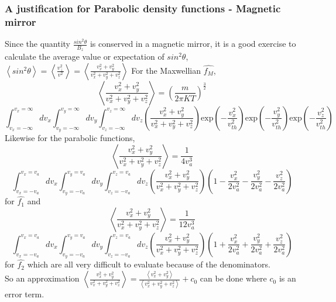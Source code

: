 \documentclass[12pt]{article}
\begin{document}
	\subsubsection{A justification for Parabolic density functions - Magnetic mirror}
	\noindent Since the quantity $\frac{\displaystyle sin^{2}\theta}{\displaystyle B_{z}}$ is conserved in a magnetic mirror, it is a good exercise to calculate the average value or expectation of $sin^{2}\theta$, $\left\langle sin^{2}\theta\right\rangle = \left\langle \frac{\displaystyle v_{\perp}^{2}}{\displaystyle v^{2}}\right\rangle = \left\langle \frac{\displaystyle v_{x}^{2} + v_{y}^{2}}{\displaystyle v_{x}^{2} + v_{y}^{2} +  v_{z}^{2}}\right\rangle $ 
	For the Maxwellian $\widehat{f_{M}}$,
	$$\left\langle \frac{\displaystyle v_{x}^{2} + v_{y}^{2}}{\displaystyle v_{x}^{2} + v_{y}^{2} +  v_{z}^{2}}\right\rangle = \left(\frac{m}{2\pi KT}\right)^{\frac{3}{2}} $$ 
	$$ \int_{v_{x} = - \infty}^{v_{x} = \infty} d v_{x} \int_{v_{y} = - \infty}^{v_{y} = \infty} d v_{y} \int_{v_{z} = - \infty}^{v_{z} = \infty} d v_{z} \left( \frac{\displaystyle v_{x}^{2} + v_{y}^{2}}{\displaystyle v_{x}^{2} + v_{y}^{2} + v_{z}^{2}} \right)  \mathrm{exp}\left(-\frac{v_{x}^{2}}{v_{th}^{2}}\right) \mathrm{exp}\left(-\frac{v_{y}^{2}}{v_{th}^{2}}\right) \mathrm{exp}\left(-\frac{v_{z}^{2}}{v_{th}^{2}}\right)$$
	Likewise for the parabolic functions,
	$$\left\langle \frac{\displaystyle v_{x}^{2} + v_{y}^{2}}{\displaystyle v_{x}^{2} + v_{y}^{2} +  v_{z}^{2}}\right\rangle = \frac{1}{4 v_{a}^{3}} $$ $$\int_{v_{x} = - v_{a}}^{v_{x} = v_{a}} d v_{x} \int_{v_{y} = - v_{a}}^{v_{y} = v_{a}} d v_{y} \int_{v_{z} = - v_{a}}^{v_{z} = v_{a}} d v_{z} \left( \frac{\displaystyle v_{x}^{2} + v_{y}^{2}}{\displaystyle v_{x}^{2} + v_{y}^{2} + v_{z}^{2}} \right)  \left(1 - \frac{v_{x}^{2}}{2 v_{a}^2} - \frac{v_{y}^{2}}{2 v_{a}^2} - \frac{v_{z}^{2}}{2 v_{a}^2} \right) $$
	for $\hat{f_{1}}$ and
	$$\left\langle \frac{\displaystyle v_{x}^{2} + v_{y}^{2}}{\displaystyle v_{x}^{2} + v_{y}^{2} +  v_{z}^{2}}\right\rangle = \frac{1}{12 v_{a}^{3}} $$ $$\int_{v_{x} = - v_{a}}^{v_{x} = v_{a}} d v_{x} \int_{v_{y} = - v_{a}}^{v_{y} = v_{a}} d v_{y} \int_{v_{z} = - v_{a}}^{v_{z} = v_{a}} d v_{z} \left( \frac{\displaystyle v_{x}^{2} + v_{y}^{2}}{\displaystyle v_{x}^{2} + v_{y}^{2} + v_{z}^{2}} \right)  \left(1 + \frac{v_{x}^{2}}{2 v_{a}^2} + \frac{v_{y}^{2}}{2 v_{a}^2} + \frac{v_{z}^{2}}{2 v_{a}^2} \right) $$
	for $\hat{f_{2}}$ which are all very difficult to evaluate because of the denominators. \\
	\noindent So an approximation $\left\langle \frac{\displaystyle v_{x}^{2} + v_{y}^{2}}{\displaystyle v_{x}^{2} + v_{y}^{2} +  v_{z}^{2}}\right\rangle =  \frac{\displaystyle \left\langle v_{x}^{2} + v_{y}^{2}\right\rangle}  {\displaystyle \left\langle v_{x}^{2} + v_{y}^{2} +  v_{z}^{2}\right\rangle} + c_{0}$ can be done where $c_{0}$ is an error term.\\
	
\end{document}
